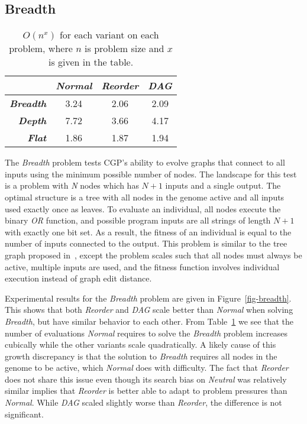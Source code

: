 \documentclass{sig-alternate}
\begin{document}



\subsection{Breadth}

\begin{table}
	\centering
	\begin{tabular}{|r|c|c|c|}
	  \hline
& \textbf{\emph{Normal}} & \textbf{\emph{Reorder}} & \textbf{\emph{DAG}} \\ \hline
\textbf{\emph{Breadth}} & 3.24 & 2.06 & 2.09 \\ \hline
  \textbf{\emph{Depth}} & 7.72 & 3.66 & 4.17 \\ \hline
   \textbf{\emph{Flat}} & 1.86 & 1.87 & 1.94 \\ \hline
	
	\end{tabular}
	\caption{$O(n^x)$ for each variant on each problem, where $n$ is problem size and $x$ is given in
	         the table.}
	\label{table-growth}
\end{table}


The \emph{Breadth} problem tests CGP's ability to evolve
graphs that connect to all inputs using the minimum possible number of nodes.
The landscape for this test is a problem with \emph{N} nodes which has $N+1$
inputs and a single output.  The optimal structure is a tree with all nodes in the genome
active and all inputs used exactly once as leaves.  To evaluate
an individual, all nodes execute the binary \emph{OR} function,
and possible program inputs are all strings of length $N+1$ with exactly one bit
set.  As a result, the fitness of an individual is equal to the number of inputs
connected to the output.  This problem is similar to the tree graph proposed
in~\cite{payne:2009:bias}, except the problem scales such that all nodes
must always be active, multiple inputs are used,
and the fitness function involves individual execution instead of graph edit distance.

Experimental results for the \emph{Breadth} problem are given in Figure~\ref{fig-breadth}.
This shows that both \emph{Reorder} and \emph{DAG} scale better than \emph{Normal} when solving \emph{Breadth},
but have similar behavior to each other.
From Table~\ref{table-growth} we see that the number of evaluations \emph{Normal} requires
to solve the \emph{Breadth} problem increases cubically while the other variants scale
quadratically.  A likely cause of this growth discrepancy is that the solution to \emph{Breadth} requires
all nodes in the genome to be active, which \emph{Normal} does with difficulty.
The fact that \emph{Reorder} does not share this issue even though its
search bias on \emph{Neutral} was relatively similar implies that \emph{Reorder} is better
able to adapt to problem pressures than \emph{Normal}.  While \emph{DAG} scaled
slightly worse than \emph{Reorder}, the difference is not significant.
\end{document}
